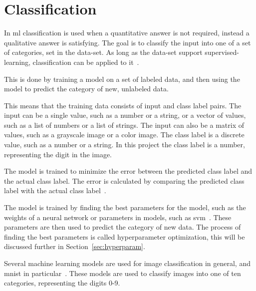 \section{Classification}\label{sec:classification}
In \gls{ml} classification is used when a quantitative answer is not required, instead a qualitative answer is satisfying. The goal is to classify the input into one of a set of categories, set in the data-set. As long as the data-set support supervised-learning, classification can be applied to it~\cite{james-statistical-learning}.  

This is done by training a model on a set of labeled data, and then using the model to predict the category of new, unlabeled data. 

This means that the training data consists of input and class label pairs. The input can be a single value, such as a number or a string, or a vector of values, such as a list of numbers or a list of strings. The input can also be a matrix of values, such as a grayscale image or a color image. The class label is a discrete value, such as a number or a string. In this project the class label is a number, representing the digit in the image. 

The model is trained to minimize the error between the predicted class label and the actual class label. The error is calculated by comparing the predicted class label with the actual class label~\cite{james-statistical-learning}. 

The model is trained by finding the best parameters for the model, such as the weights of a neural network or parameters in models, such as \gls{svm}~\cite{james-statistical-learning}. These parameters are then used to predict the category of new data. The process of finding the best parameters is called hyperparameter optimization, this will be discussed further in Section~\ref{sec:hyperparam}.

Several machine learning models are used for image classification in general, and \gls{mnist} in particular~\cite{lecun-mnist-database,IBM-computer-vision,convolutional-neural-networks-convnets,multi-column-neural-network-ciregan}. These models are used to classify images into one of ten categories, representing the digits 0-9. 

